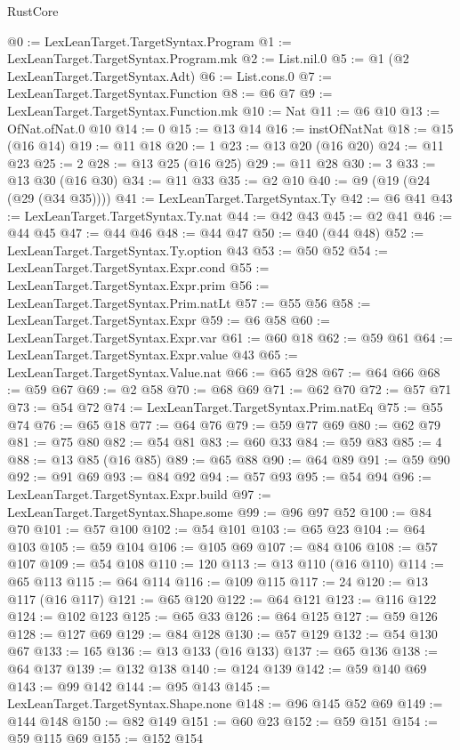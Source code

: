 \begin{lexlean}{RustCore}
\begin{coremodule}
@0 := LexLeanTarget.TargetSyntax.Program
@1 := LexLeanTarget.TargetSyntax.Program.mk
@2 := List.nil.{0}
@5 := @1 (@2 LexLeanTarget.TargetSyntax.Adt)
@6 := List.cons.{0}
@7 := LexLeanTarget.TargetSyntax.Function
@8 := @6 @7
@9 := LexLeanTarget.TargetSyntax.Function.mk
@10 := Nat
@11 := @6 @10
@13 := OfNat.ofNat.{0} @10
@14 := 0
@15 := @13 @14
@16 := instOfNatNat
@18 := @15 (@16 @14)
@19 := @11 @18
@20 := 1
@23 := @13 @20 (@16 @20)
@24 := @11 @23
@25 := 2
@28 := @13 @25 (@16 @25)
@29 := @11 @28
@30 := 3
@33 := @13 @30 (@16 @30)
@34 := @11 @33
@35 := @2 @10
@40 := @9 (@19 (@24 (@29 (@34 @35))))
@41 := LexLeanTarget.TargetSyntax.Ty
@42 := @6 @41
@43 := LexLeanTarget.TargetSyntax.Ty.nat
@44 := @42 @43
@45 := @2 @41
@46 := @44 @45
@47 := @44 @46
@48 := @44 @47
@50 := @40 (@44 @48)
@52 := LexLeanTarget.TargetSyntax.Ty.option @43
@53 := @50 @52
@54 := LexLeanTarget.TargetSyntax.Expr.cond
@55 := LexLeanTarget.TargetSyntax.Expr.prim
@56 := LexLeanTarget.TargetSyntax.Prim.natLt
@57 := @55 @56
@58 := LexLeanTarget.TargetSyntax.Expr
@59 := @6 @58
@60 := LexLeanTarget.TargetSyntax.Expr.var
@61 := @60 @18
@62 := @59 @61
@64 := LexLeanTarget.TargetSyntax.Expr.value @43
@65 := LexLeanTarget.TargetSyntax.Value.nat
@66 := @65 @28
@67 := @64 @66
@68 := @59 @67
@69 := @2 @58
@70 := @68 @69
@71 := @62 @70
@72 := @57 @71
@73 := @54 @72
@74 := LexLeanTarget.TargetSyntax.Prim.natEq
@75 := @55 @74
@76 := @65 @18
@77 := @64 @76
@79 := @59 @77 @69
@80 := @62 @79
@81 := @75 @80
@82 := @54 @81
@83 := @60 @33
@84 := @59 @83
@85 := 4
@88 := @13 @85 (@16 @85)
@89 := @65 @88
@90 := @64 @89
@91 := @59 @90
@92 := @91 @69
@93 := @84 @92
@94 := @57 @93
@95 := @54 @94
@96 := LexLeanTarget.TargetSyntax.Expr.build
@97 := LexLeanTarget.TargetSyntax.Shape.some
@99 := @96 @97 @52
@100 := @84 @70
@101 := @57 @100
@102 := @54 @101
@103 := @65 @23
@104 := @64 @103
@105 := @59 @104
@106 := @105 @69
@107 := @84 @106
@108 := @57 @107
@109 := @54 @108
@110 := 120
@113 := @13 @110 (@16 @110)
@114 := @65 @113
@115 := @64 @114
@116 := @109 @115
@117 := 24
@120 := @13 @117 (@16 @117)
@121 := @65 @120
@122 := @64 @121
@123 := @116 @122
@124 := @102 @123
@125 := @65 @33
@126 := @64 @125
@127 := @59 @126
@128 := @127 @69
@129 := @84 @128
@130 := @57 @129
@132 := @54 @130 @67
@133 := 165
@136 := @13 @133 (@16 @133)
@137 := @65 @136
@138 := @64 @137
@139 := @132 @138
@140 := @124 @139
@142 := @59 @140 @69
@143 := @99 @142
@144 := @95 @143
@145 := LexLeanTarget.TargetSyntax.Shape.none
@148 := @96 @145 @52 @69
@149 := @144 @148
@150 := @82 @149
@151 := @60 @23
@152 := @59 @151
@154 := @59 @115 @69
@155 := @152 @154

\end{coremodule}
\end{lexlean}
